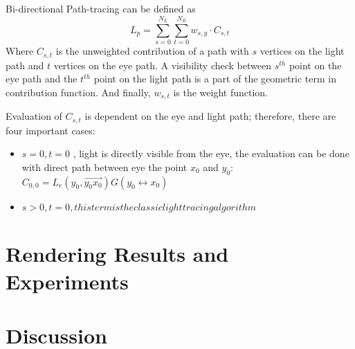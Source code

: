 \documentclass[11pt, a4paper]{article}
\begin{document}
Bi-directional Path-tracing can be defined as 
\begin{equation}
	L_p = \sum_{s=0}^{N_L}\sum_{t=0}^{N_E} w_{s,y} \cdot C_{s,t}
\end{equation}
Where $C_{s,t}$ is the unweighted contribution of a path with $s$ vertices on the light path and $t$ vertices on the eye path. A visibility check between $s^{th}$ point on the eye path and the $t^{th}$ point on the light path is a part of the geometric term in contribution function. And finally, $w_{s,t}$ is the weight function.

Evaluation of $C_{s,t}$ is dependent on the eye and light path; therefore, there are four important cases:
\begin{itemize}
	\item{$s=0,t=0$ , light is directly visible from the eye, the evaluation can be done with direct path between eye the point $x_0$ and $y_0$: $C_{0,0} = L_e(y_0,\vec{y_0x_0}) G(y_0 \leftrightarrow x_0)$}
	\item{$s>0,t=0 , this term is the classic light tracing algorithm$}

\end{itemize}


\section*{Rendering Results and Experiments}


\section*{Discussion}




\end{document}
